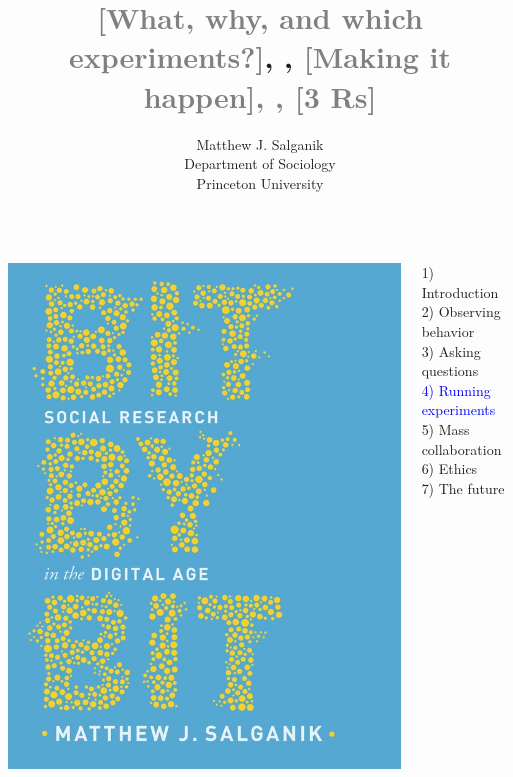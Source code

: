 \documentclass[aspectratio=169]{beamer}
\title[]{\textcolor{gray}{[What, why, and which experiments?]}, \newline [Moving beyond simple experiments], \textcolor{gray}{[Making it happen], \newline [Zero variable cost data and MusicLab], [3 Rs]}}
\author[]{Matthew J. Salganik\\Department of Sociology\\Princeton University}
\date[]{
\begin{flushright}
\texttt{[image: figures/cc-by.png]}
\end{flushright}
}
\begin{document}
\frame{\titlepage}
\begin{frame}

\begin{columns}
\begin{column}{.40\textwidth}
\includegraphics[width=\textwidth]{figures/salganik_bit_2018_cover}
\end{column}%

\hfill%

\begin{column}{.60\textwidth}
1) Introduction \\
2) Observing behavior \\
3) Asking questions \\
\textcolor{blue}{4) Running experiments} \\
5) Mass collaboration \\
6) Ethics \\
7) The future \\
\end{column}%
\end{columns}

\end{frame}
\end{document}
